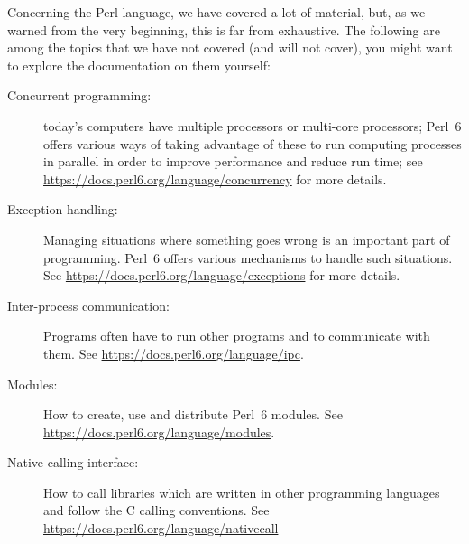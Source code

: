 Concerning the Perl language, we have covered a lot of 
material, but, as we warned from the very beginning, 
this is far from exhaustive. The following are among 
the topics that we have not covered (and will not cover), 
you might want to explore the documentation on them 
yourself:

\begin{description}
\item[Concurrent programming:] today's computers have 
multiple processors or multi-core processors; Perl~6 
offers various ways of taking advantage of these to 
run computing processes in parallel in order to 
improve performance and reduce run time; see 
\url{https://docs.perl6.org/language/concurrency} 
for more details.

\item[Exception handling:] Managing situations where 
something goes wrong is an important part of 
programming. Perl~6 offers various mechanisms to 
handle such situations. See \url{https://docs.perl6.org/language/exceptions} 
for more details.

\item[Inter-process communication:] Programs often have to 
run other programs and to communicate with them. See 
\url{https://docs.perl6.org/language/ipc}.

\item[Modules:] How to create, use and distribute Perl~6 
modules. See \url{https://docs.perl6.org/language/modules}.

\item[Native calling interface:] How to call libraries 
which are written in other programming languages and 
follow the C calling conventions. 
See \url{https://docs.perl6.org/language/nativecall}

\end{description}